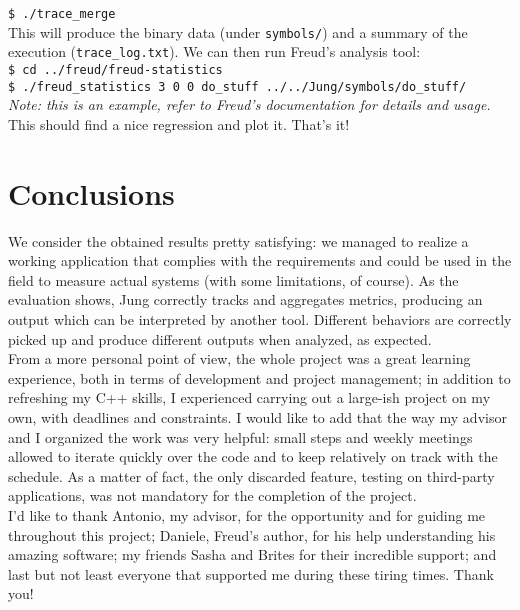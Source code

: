         \texttt{\$ ./trace\_merge}\\

        This will produce the binary data (under \texttt{symbols/}) and a summary of the execution
        (\texttt{trace\_log.txt}).
        We can then run Freud's analysis tool:\\

        \texttt{\$ cd ../freud/freud-statistics}\\

        \texttt{\$ ./freud\_statistics 3 0 0 do\_stuff ../../Jung/symbols/do\_stuff/}\\
        
        \textit{Note: this is an example, refer to Freud's documentation for details and usage.}\\

        This should find a nice regression and plot it. That's it!


\chapter{Conclusions}


    We consider the obtained results pretty satisfying: we managed to realize a working application
    that complies with the requirements and could be used in the field to measure actual systems
    (with some limitations, of course). As the evaluation shows, Jung correctly tracks and aggregates
    metrics, producing an output which can be interpreted by another tool. Different behaviors are
    correctly picked up and produce different outputs when analyzed, as expected.\\
    
    From a more personal point of view, the whole project was a great learning experience, both
    in terms of development and project management; in addition to refreshing my C++ skills, I
    experienced carrying out a large-ish project on my own, with deadlines and constraints.
    I would like to add that the way my advisor and I organized the work was very helpful: small
    steps and weekly meetings allowed to iterate quickly over the code and to keep 
    relatively on track with the schedule. As a matter of fact, the only discarded feature,
    testing on third-party applications, was not mandatory for the completion of the project.\\

    I'd like to thank Antonio, my advisor, for the opportunity and for guiding me throughout
    this project; Daniele, Freud's author, for his help understanding his amazing software;
    my friends Sasha and Brites for their incredible support;
    and last but not least everyone that supported me during these tiring times. Thank you!


